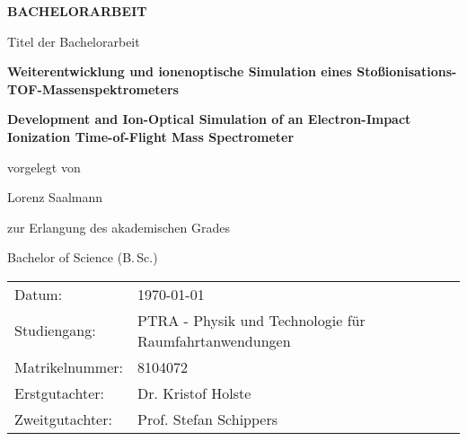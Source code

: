 {%
\pagestyle{empty}
\sffamily


\vfill
{\bfseries\Huge BACHELORARBEIT}

\vfill
Titel der Bachelorarbeit

{\LARGE\bfseries Weiterentwicklung und ionenoptische Simulation eines Stoßionisations-TOF-Massenspektrometers}
\vfill

{\Large\bfseries Development and Ion-Optical Simulation of an
Electron-Impact Ionization Time-of-Flight Mass
Spectrometer}
\vfill

vorgelegt von

{\Large Lorenz Saalmann}

\vspace{15mm}

zur Erlangung des akademischen Grades

{\Large Bachelor of Science (B.\,Sc.)}
\vfill


\vspace{15mm}

\raggedright
\begin{tabular}{p{}p{}}
Datum:          & \today \\[1.0ex]
Studiengang:    &  PTRA - Physik und Technologie f\"{u}r Raumfahrtanwendungen\\[1.0ex]
Matrikelnummer: &  8104072\\[1.0ex]
Erstgutachter:  &  Dr. Kristof Holste \\[1.0ex]
Zweitgutachter: &  Prof. Stefan Schippers \\
\end{tabular}
\cleardoublepage
}%